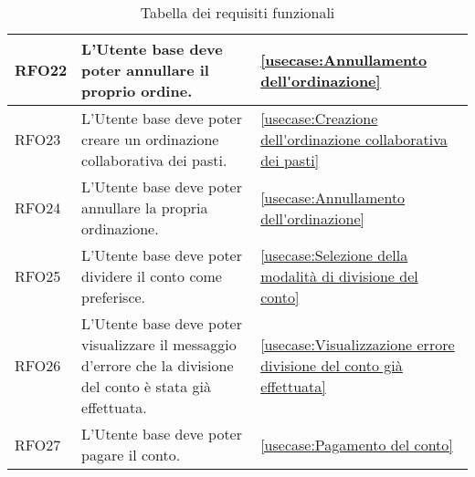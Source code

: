 \begin{table}[H]
\begin{tabularx}{\textwidth}{l|X|p{2cm}}
		\hline
		RFO22       & L'Utente base deve poter annullare il proprio ordine.                                                          & \autoref{usecase:Annullamento dell'ordinazione}                             \\
		\hline
		RFO23       & L'Utente base deve poter creare un ordinazione collaborativa dei pasti.                                        & \autoref{usecase:Creazione dell'ordinazione collaborativa dei pasti}        \\
		\hline
		RFO24       & L'Utente base deve poter annullare la propria ordinazione.                                                     & \autoref{usecase:Annullamento dell'ordinazione}                             \\
		\hline
		RFO25       & L'Utente base deve poter dividere il conto come preferisce.                                                    & \autoref{usecase:Selezione della modalità di divisione del conto}           \\
		\hline
		RFO26       & L'Utente base deve poter visualizzare il messaggio d'errore che la divisione del conto è stata già effettuata. & \autoref{usecase:Visualizzazione errore divisione del conto già effettuata} \\
		\hline
		RFO27       & L'Utente base deve poter pagare il conto.                                                                      & \autoref{usecase:Pagamento del conto}                                       \\
	\end{tabularx}
	\caption{Tabella dei requisiti funzionali}
\end{table}


